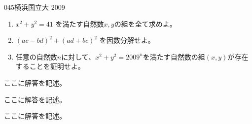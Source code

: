 \begin{prob}{045}{}{横浜国立大 2009}
 \begin{enumerate}
  \item $x^2+y^2=41$ を満たす自然数$x,y$の組を全て求めよ。
  \item $(ac-bd)^2+(ad+bc)^2$ を因数分解せよ。
  \item 任意の自然数$n$に対して、$x^2+y^2=2009^n$を満たす自然数の組$(x,y)$が存在することを証明せよ。
 \end{enumerate}
\end{prob}
ここに解答を記述。

ここに解答を記述。

ここに解答を記述。